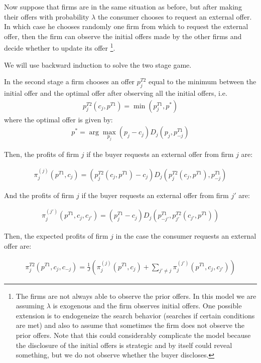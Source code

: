 \documentclass[12pt]{article}
\begin{document}
Now suppose that firms are in the same situation as before, but after making their offers with probability $\lambda$ the consumer chooses to request an external offer. In which case he chooses randomly one firm from which to request the external offer, then the firm can observe the initial offers made by the other firms and decide whether to update its offer \footnote{The firms are not always able to observe the prior offers. In this model we are assuming $\lambda$ is exogenous and the firm observes initial offers. One possible extension is to endogeneize the search behavior (searches if certain conditions are met) and also to assume that sometimes the firm does not observe the prior offers. Note that this could considerably complicate the model because the disclosure of the initial offers is strategic and by itself could reveal something, but we do not observe whether the buyer discloses. }.

We will use backward induction to solve the two stage game. 

In the second stage a firm chooses an offer $p_{j}^{T2}$ equal to the minimum between the initial offer and the optimal offer after observing all the initial offers, i.e. 
\begin{align}
\label{eq:base_equilibrium2}
    p_{j}^{T2}(c_j, p^{T1}) = \min(p_j^{T1}, p^*)
\end{align}
where the optimal offer is given by: 
\begin{align}
    p^* = \arg \max_{p_j} (p_j - c_j) D_j(p_j, p_{-j}^{T1}) 
\end{align}



Then, the profits of firm $j$ if the buyer requests an external offer from firm $j$ are: 

\begin{align}
    \pi_j^{(j)}(p^{T1}, c_j) =   (p_j^{T2}(c_j, p^{T1}) - c_j) D_j(p_j^{T2}(c_j, p^{T1}), p_{-j}^{T1}) 
\end{align}

And the profits of firm $j$ if the buyer requests an external offer from firm $j'$ are: 

\begin{align}
    \pi_j^{(j')}(p^{T1}, c_j, c_{j'}) = (p_j^{T1} - c_j) D_j(p_{-j'}^{T1}, p_{ j'}^{T2}(c_{j'}, p^{T1})) 
\end{align}

Then, the expected profits of firm $j$ in the case the consumer requests an external offer are: 

\begin{align}\label{eq:profits_external2}
    \pi_j^{T2}(p^{T1}, c_j, c_{-j}) =  \frac{1}{J} \left( \pi_j^{(j)}(p^{T1}, c_j)   + \sum_{j'\neq j} \pi_j^{(j')}(p^{T1}, c_j, c_{j'}) \right)
\end{align}
\end{document}
